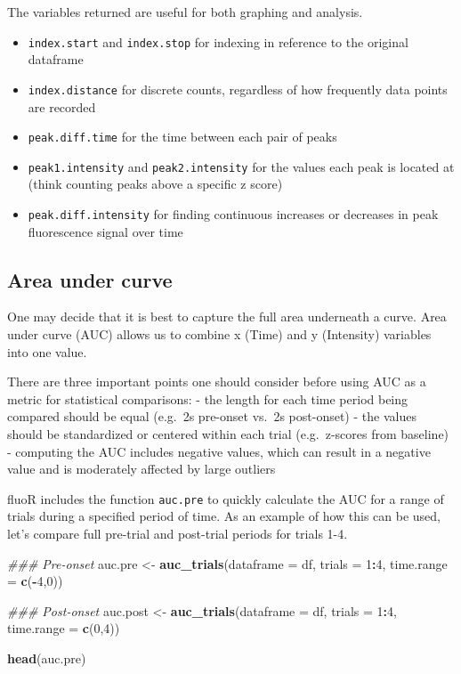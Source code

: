 \documentclass[
]{book}
\newenvironment{Shaded}{\begin{snugshade}}{\end{snugshade}}
\newcommand{\CommentTok}[1]{\textcolor[rgb]{0.56,0.35,0.01}{\textit{#1}}}
\newcommand{\DataTypeTok}[1]{\textcolor[rgb]{0.13,0.29,0.53}{#1}}
\newcommand{\DecValTok}[1]{\textcolor[rgb]{0.00,0.00,0.81}{#1}}
\newcommand{\KeywordTok}[1]{\textcolor[rgb]{0.13,0.29,0.53}{\textbf{#1}}}
\newcommand{\NormalTok}[1]{#1}
\newcommand{\OperatorTok}[1]{\textcolor[rgb]{0.81,0.36,0.00}{\textbf{#1}}}
\newcommand{\StringTok}[1]{\textcolor[rgb]{0.31,0.60,0.02}{#1}}
\providecommand{\tightlist}{%
  \setlength{\itemsep}{0pt}\setlength{\parskip}{0pt}}
\begin{document}
The variables returned are useful for both graphing and analysis.

\begin{itemize}
\tightlist
\item
  \texttt{index.start} and \texttt{index.stop} for indexing in reference to the original dataframe
\item
  \texttt{index.distance} for discrete counts, regardless of how frequently data points are recorded
\item
  \texttt{peak.diff.time} for the time between each pair of peaks
\item
  \texttt{peak1.intensity} and \texttt{peak2.intensity} for the values each peak is located at (think counting peaks above a specific z score)
\item
  \texttt{peak.diff.intensity} for finding continuous increases or decreases in peak fluorescence signal over time
\end{itemize}

\hypertarget{analysis-metrics-auc}{%
\subsection{Area under curve}\label{analysis-metrics-auc}}

One may decide that it is best to capture the full area underneath a curve. Area under curve (AUC) allows us to combine x (Time) and y (Intensity) variables into one value.

There are three important points one should consider before using AUC as a metric for statistical comparisons:
- the length for each time period being compared should be equal (e.g.~2s pre-onset vs.~2s post-onset)
- the values should be standardized or centered within each trial (e.g.~z-scores from baseline)
- computing the AUC includes negative values, which can result in a negative value and is moderately affected by large outliers

fluoR includes the function \texttt{auc.pre} to quickly calculate the AUC for a range of trials during a specified period of time. As an example of how this can be used, let's compare full pre-trial and post-trial periods for trials 1-4.

\begin{Shaded}
\begin{Highlighting}[]
\CommentTok{### Pre-onset}
\NormalTok{auc.pre <-}\StringTok{ }\KeywordTok{auc_trials}\NormalTok{(}\DataTypeTok{dataframe =}\NormalTok{ df, }\DataTypeTok{trials =} \DecValTok{1}\OperatorTok{:}\DecValTok{4}\NormalTok{,}
                      \DataTypeTok{time.range =} \KeywordTok{c}\NormalTok{(}\OperatorTok{-}\DecValTok{4}\NormalTok{,}\DecValTok{0}\NormalTok{))}

\CommentTok{### Post-onset}
\NormalTok{auc.post <-}\StringTok{ }\KeywordTok{auc_trials}\NormalTok{(}\DataTypeTok{dataframe =}\NormalTok{ df, }\DataTypeTok{trials =} \DecValTok{1}\OperatorTok{:}\DecValTok{4}\NormalTok{,}
                       \DataTypeTok{time.range =} \KeywordTok{c}\NormalTok{(}\DecValTok{0}\NormalTok{,}\DecValTok{4}\NormalTok{))}

\KeywordTok{head}\NormalTok{(auc.pre)}
\end{Highlighting}
\end{Shaded}
\end{document}
